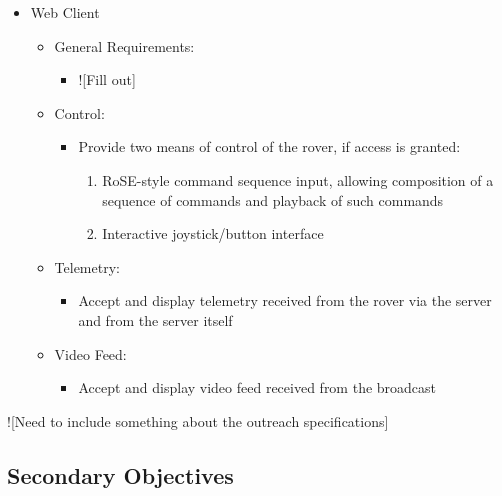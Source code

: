 \begin{itemize}
        \item Web Client
        \begin{itemize}
          \item General Requirements:
          \begin{itemize}
            \item ![Fill out]
          \end{itemize}
          \item Control:
          \begin{itemize}
            \item Provide two means of control of the rover, if access is granted:
            \begin{enumerate}
              \item RoSE-style command sequence input, allowing composition of a sequence of commands and playback of such commands
              \item Interactive joystick/button interface
            \end{enumerate}
          \end{itemize}
          \item Telemetry:
          \begin{itemize}
            \item Accept and display telemetry received from the rover via the server and from the server itself
          \end{itemize}
          \item Video Feed:
          \begin{itemize}
            \item Accept and display video feed received from the broadcast
          \end{itemize}
        \end{itemize}
      \end{itemize}
    
    ![Need to include something about the outreach specifications]
  
  \subsection{Secondary Objectives}
  \label{sec:secondary-objectives}